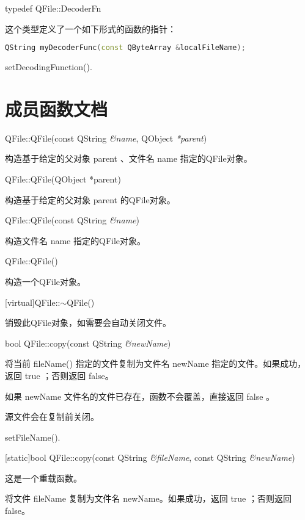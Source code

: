 typedef QFile::DecoderFn

这个类型定义了一个如下形式的函数的指针：


\begin{lstlisting}[language=C++]
QString myDecoderFunc(const QByteArray &localFileName);
\end{lstlisting}


\begin{notice}[另请参阅]
setDecodingFunction().
\end{notice} 

\splitLine

\section{成员函数文档}

QFile::QFile(const QString \emph{\&name}, QObject \emph{*parent})

构造基于给定的父对象 parent 、文件名 name 指定的QFile对象。

QFile::QFile(QObject *parent)

构造基于给定的父对象 parent 的QFile对象。

QFile::QFile(const QString \emph{\&name})

构造文件名 name 指定的QFile对象。

QFile::QFile()

构造一个QFile对象。

[virtual]QFile::$\sim$QFile()

销毁此QFile对象，如需要会自动关闭文件。

bool QFile::copy(const QString \emph{\&newName})

将当前 fileName() 指定的文件复制为文件名 newName 指定的文件。如果成功，返回 true ；否则返回 false。


\begin{notice}
如果 newName 文件名的文件已存在，函数不会覆盖，直接返回 false 。
\end{notice} 

源文件会在复制前关闭。

\begin{notice}[另请参阅]
setFileName().
\end{notice} 

[static]bool QFile::copy(const QString \emph{\&fileName}, const QString \emph{\&newName})

这是一个重载函数。

将文件 fileName 复制为文件名 newName。如果成功，返回 true ；否则返回 false。



